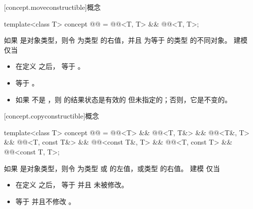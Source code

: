 [concept.moveconstructible]{概念 }

\begin{itemdecl}
template<class T>
concept @@ = @@<T, T> && @@<T, T>;
\end{itemdecl}

\begin{itemdescr}
\pnum
如果  是对象类型，则令  为类型
 的右值，并且  为等于
 的类型  的不同对象。 建模  仅当

\begin{itemize}
\item 在定义  之后， 等于 。

\item {} 等于 。

\item 如果  不是 ，则  的结果状态是有效的
但未指定的；否则，它是不变的。
\end{itemize}
\end{itemdescr}

[concept.copyconstructible]{概念 }

\begin{itemdecl}
template<class T>
concept @@ =
  @@<T> &&
  @@<T, T&> && @@<T&, T> &&
  @@<T, const T&> && @@<const T&, T> &&
  @@<T, const T> && @@<const T, T>;
\end{itemdecl}

\begin{itemdescr}
\pnum
如果  是对象类型，则令  为类型
 或  的左值，或类型  的右值。
 建模  仅当

\begin{itemize}
\item 在定义  之后，
 等于  并且
 未被修改。

\item {} 等于  并且不修改 。
\end{itemize}

\end{itemdescr}

